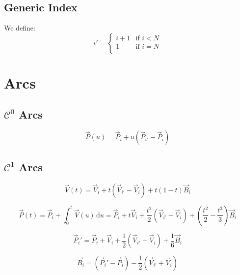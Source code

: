 \documentclass[aps,12pt]{revtex4}
\begin{document}
\subsection{Generic Index}
We define:
\begin{equation}
	i' =
	\left\lbrace
	\begin{array}{rcl}
		i+1 & \mbox{if } i<N\\
		1   & \mbox{if } i=N\\
	\end{array}
	\right.
\end{equation}


\section{Arcs}

\subsection{$\mathcal{C}^0$ Arcs}

\begin{equation}
	\vec{P}(u) = \vec{P}_i + u \left(\vec{P}_{i'} - \vec{P}_{i}\right)
\end{equation}

\subsection{$\mathcal{C}^1$ Arcs}

\begin{equation}
	\vec{V}(t) = \vec{V}_i + t \left(\vec{V}_{i'}-\vec{V}_i\right) + t(1-t) \vec{B}_i
\end{equation}

\begin{equation}
	\vec{P}(t) = \vec{P}_i + \int_0^t \vec{V}(u) \, \mathrm{d} u 
	= \vec{P}_i + t\vec{V}_i  + \frac{t^2}{2} \left(\vec{V}_{i'}-\vec{V}_i\right) + \left(\frac{t^2}{2} - \frac{t^3}{3}\right) \vec{B}_i
\end{equation}

\begin{equation}
	\vec{P}_i' = \vec{P}_i + \vec{V}_i  + \frac{1}{2} \left(\vec{V}_{i'}-\vec{V}_i\right) + \frac{1}{6} \vec{B}_i
\end{equation}


\begin{equation}
	\boxed{\vec{B}_i = \left(\vec{P}_i'-\vec{P}_i\right) - \frac{1}{2}  \left(\vec{V}_{i'}+\vec{V}_i\right)}
\end{equation}
\end{document}
